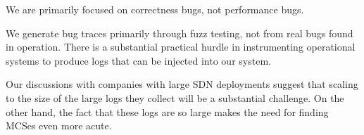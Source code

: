 We are primarily focused on correctness bugs, not performance bugs.

We generate bug traces primarily through fuzz testing, not from real bugs
found in operation. There is a substantial practical hurdle in instrumenting
operational systems to produce logs that can be injected into our system. %

Our discussions with companies with large SDN deployments suggest that scaling to the size of the
large logs they collect will be a substantial challenge.
On the other hand, the fact that these logs are so large makes the need for finding MCSes even more acute.



